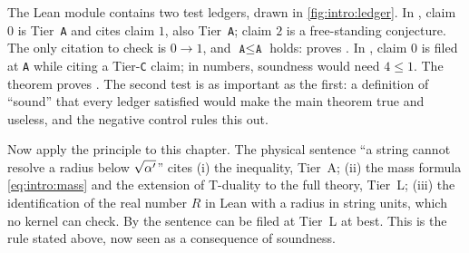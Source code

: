 \begin{example}\label{ex:intro:ledger}
The Lean module contains two test ledgers, drawn in \cref{fig:intro:ledger}. In
, claim $0$ is Tier~\texttt{A} and cites claim $1$, also Tier~\texttt{A};
claim $2$ is a free-standing conjecture. The only citation to check is $0\to1$, and
$\texttt{A}\le\texttt{A}$ holds:  proves
. In , claim $0$ is filed at \texttt{A} while
citing a Tier-\texttt{C} claim; in numbers, soundness would need $4\le1$. The theorem
 proves . The second test is as
important as the first: a definition of ``sound'' that every ledger satisfied would make the
main theorem true and useless, and the negative control rules this out.

Now apply the principle to this chapter. The physical sentence ``a string cannot resolve a
radius below $\sqrt{\alpha'}$'' cites (i) the inequality, Tier~A; (ii) the mass formula
\eqref{eq:intro:mass} and the extension of T-duality to the full theory, Tier~L; (iii) the
identification of the real number $R$ in Lean with a radius in string units, which no kernel
can check. By  the sentence can be filed at Tier~L at best. This is
the rule stated above, now seen as a consequence of soundness.
\end{example}


